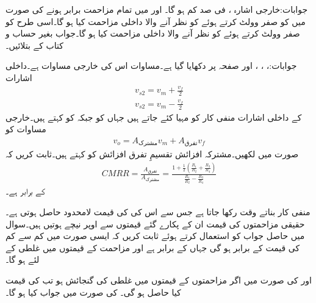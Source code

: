 جوابات:خارجی اشارہ  ،  فی صد کم ہو گا۔
 اور  میں تمام مزاحمت برابر ہونے کی صورت میں   کو صفر وولٹ کرتے ہوئے  کو نظر آنے والا داخلی مزاحمت کیا ہو گا۔اسی طرح   کو صفر وولٹ کرتے ہوئے  کو نظر آنے والا داخلی مزاحمت کیا ہو گا۔جواب بغیر حساب و کتاب کے بتلائیں۔

جوابات:، ، ، اور 
صفحہ  پر  دکھایا گیا ہے۔مساوات  اس کی خارجی مساوات ہے۔داخلی اشارات
\begin{align*}
v_{s2}=v_m+\frac{v_f}{2}\\
v_{s2}=v_m-\frac{v_f}{2}
\end{align*}
کے داخلی اشارات منفی کار کو مہیا کئے جاتے ہیں جہاں  کو  جبکہ  کو  کہتے ہیں۔خارجی مساوات کو
\begin{align}
v_o=A_{\textrm{مشترک}} v_m +A_{\textrm{تفرق}} v_f
\end{align}
صورت میں لکھیں۔مشترکہ افزائش تقسیمِ تفرق افزائش کو   کہتے ہیں۔ثابت کریں کہ
\begin{align*}
CMRR=\frac{A_{\textrm{تفرق}}}{A_{\textrm{مشترک}}}=\frac{1+\frac{1}{2}\left(\frac{R_1}{R_2}+\frac{R_3}{R_4} \right)}{\frac{R_1}{R_2}-\frac{R_3}{R_4}}
\end{align*}
کے برابر ہے۔

منفی کار بناتے وقت  رکھا جاتا ہے جس سے  اس کی  کی قیمت لامحدود حاصل ہوتی ہے۔حقیقی مزاحمتوں کی قیمت ان کے پکارے گئے قیمتوں سے اوپر نیچے ہوتیں ہیں۔سوال  میں حاصل جواب کو استعمال کرتے ہوئے ثابت کریں کہ ایسی صورت میں  کم سے کم   کی قیمت  کے برابر ہو گی جہاں  کے برابر ہے اور مزاحمت کے قیمتوں میں  غلطی کے لئے  ہو گا۔

 اور  کی صورت میں اگر مزاحمتوں کے قیمتوں میں   غلطی کی گنجائش ہو تب   کی قیمت کیا حاصل ہو گی۔ کی صورت میں جواب کیا ہو گا۔ 

